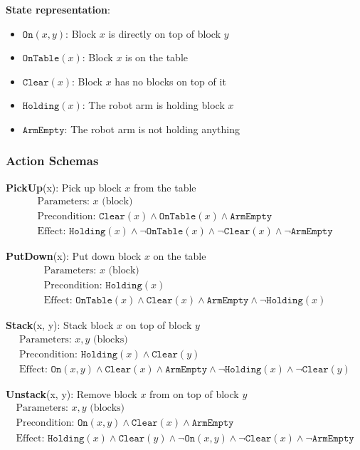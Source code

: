 \documentclass[11pt,a4paper]{article}
\theoremstyle{definition}
\theoremstyle{plain}
\theoremstyle{remark}
\begin{document}
\textbf{State representation}:
\begin{itemize}
    \item $\texttt{On}(x, y)$: Block $x$ is directly on top of block $y$
    \item $\texttt{OnTable}(x)$: Block $x$ is on the table
    \item $\texttt{Clear}(x)$: Block $x$ has no blocks on top of it
    \item $\texttt{Holding}(x)$: The robot arm is holding block $x$
    \item $\texttt{ArmEmpty}$: The robot arm is not holding anything
\end{itemize}

\subsubsection{Action Schemas}

\textbf{PickUp}(x): Pick up block $x$ from the table
\[
\begin{array}{l}
\text{Parameters: } x \text{ (block)} \\
\text{Precondition: } \texttt{Clear}(x) \land \texttt{OnTable}(x) \land \texttt{ArmEmpty} \\
\text{Effect: } \texttt{Holding}(x) \land \neg \texttt{OnTable}(x) \land \neg \texttt{Clear}(x) \land \neg \texttt{ArmEmpty}
\end{array}
\]

\textbf{PutDown}(x): Put down block $x$ on the table
\[
\begin{array}{l}
\text{Parameters: } x \text{ (block)} \\
\text{Precondition: } \texttt{Holding}(x) \\
\text{Effect: } \texttt{OnTable}(x) \land \texttt{Clear}(x) \land \texttt{ArmEmpty} \land \neg \texttt{Holding}(x)
\end{array}
\]

\textbf{Stack}(x, y): Stack block $x$ on top of block $y$
\[
\begin{array}{l}
\text{Parameters: } x, y \text{ (blocks)} \\
\text{Precondition: } \texttt{Holding}(x) \land \texttt{Clear}(y) \\
\text{Effect: } \texttt{On}(x, y) \land \texttt{Clear}(x) \land \texttt{ArmEmpty} \land \neg \texttt{Holding}(x) \land \neg \texttt{Clear}(y)
\end{array}
\]

\textbf{Unstack}(x, y): Remove block $x$ from on top of block $y$
\[
\begin{array}{l}
\text{Parameters: } x, y \text{ (blocks)} \\
\text{Precondition: } \texttt{On}(x, y) \land \texttt{Clear}(x) \land \texttt{ArmEmpty} \\
\text{Effect: } \texttt{Holding}(x) \land \texttt{Clear}(y) \land \neg \texttt{On}(x, y) \land \neg \texttt{Clear}(x) \land \neg \texttt{ArmEmpty}
\end{array}
\]
\end{document}
